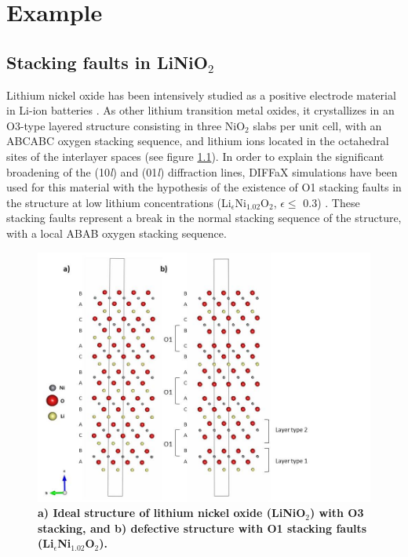\chapter{Example}
\label{example}







\section{Stacking faults in LiNiO$_{2}$}

Lithium nickel oxide has been intensively studied as a positive electrode material in Li-ion batteries \cite{Whit2004}.
As other lithium transition metal oxides, it crystallizes in an O3-type layered structure consisting in three NiO$_{2}$ slabs per unit cell, with an ABCABC oxygen stacking sequence, and lithium ions located in the octahedral sites of the interlayer spaces (see figure \ref{estructura}). In order to explain the significant broadening of the (10\emph{l}) and (01\emph{l}) diffraction lines, DIFFaX simulations have been used for this material with the hypothesis of the existence of O1 stacking faults in the structure at low lithium concentrations (Li$_{\epsilon}$Ni$_{1.02}$O$_{2}$, $\epsilon\leq$ 0.3) \cite{Crog2000}. These stacking faults represent a break in the normal stacking sequence of the structure, with a local ABAB oxygen stacking sequence.

\begin{figure}[h!]
\begin{center}
\includegraphics [width=5.3 in]{LiNO_estructura.jpg}
\caption{\bf a) Ideal structure of lithium nickel oxide (LiNiO$_{2}$) with O3 stacking, and b) defective structure with O1 stacking faults (Li$_{\epsilon}$Ni$_{1.02}$O$_{2}$).}
\label{estructura}
\end{center}
\end{figure}

